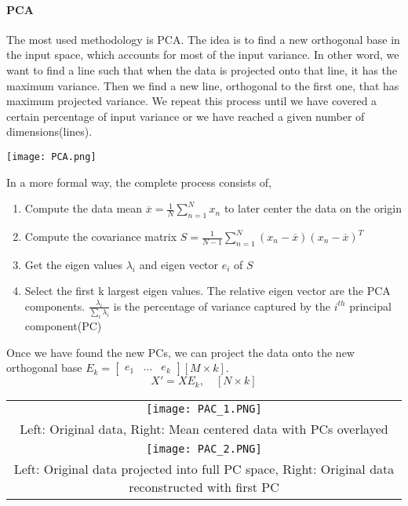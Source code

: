 \documentclass[main.tex]{subfiles}
\begin{document}
\paragraph{PCA} The most used methodology is PCA. The idea is to find a new orthogonal base in the input space, which accounts for most of the input variance. In other word, we want to find a line such that when the data is projected onto that line, it has the maximum variance. Then we find a new line, orthogonal to the first one, that has maximum projected variance. We repeat this process until we have covered a certain percentage of input variance or we have reached a given number of dimensions(lines).
\begin{center}
   \texttt{[image: PCA.png]} \\
\end{center}
In a more formal way, the complete process consists of,
\begin{enumerate}
    \item Compute the data mean $\overline{x} = \frac{1}{N} \sum_{n=1}^N x_n$ to later center the data on the origin
    \item Compute the covariance matrix $S = \frac{1}{N-1} \sum_{n=1}^N (x_n-\overline{x})(x_n-\overline{x})^T$
    \item Get the eigen values $\lambda_i$ and eigen vector $e_i$ of $S$
    \item Select the first k largest eigen values. The relative eigen vector are the PCA components. $\frac{\lambda_i}{\sum_i \lambda_i}$ is the percentage of variance captured by the $i^{th}$ principal component(PC)
\end{enumerate}
Once we have found the new PCs, we can project the data onto the new orthogonal base $E_k = \begin{bmatrix} e_1 & \dots & e_k \end{bmatrix} [M \times k]$.
\begin{equation}
    X'=XE_k, \quad [N \times k]
\end{equation}

\begin{center}
\begin{tabular}{c}
  \texttt{[image: PAC\_1.PNG]} \\
Left: Original data, Right: Mean centered data with PCs overlayed \\[6pt]
 \texttt{[image: PAC\_2.PNG]} \\
Left: Original data projected into full PC space, Right: Original data reconstructed with first PC\\[6pt]
\end{tabular}
\end{center}
\end{document}
